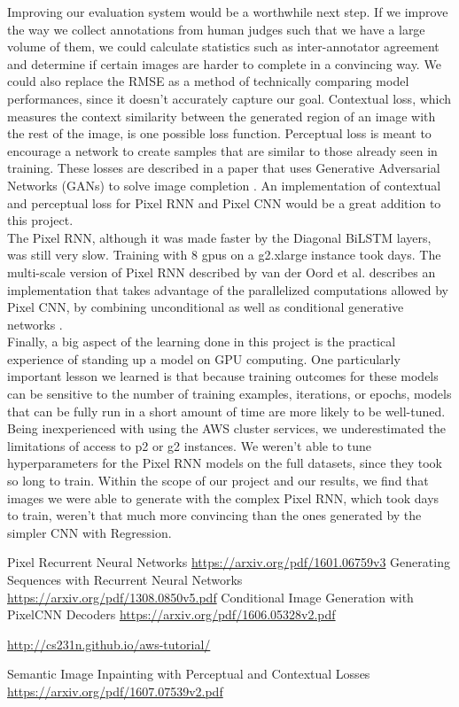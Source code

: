 \documentclass[10pt,twocolumn,letterpaper]{article}
\begin{document}
Improving our evaluation system would be a worthwhile next step. If we improve the way we collect annotations from human judges such that we have a large volume of them, we could calculate statistics such as inter-annotator agreement and determine if certain images are harder to complete in a convincing way. We could also replace the RMSE as a method of technically comparing model performances, since it doesn't accurately capture our goal. Contextual loss, which measures the context similarity between the generated region of an image with the rest of the image, is one possible loss function. Perceptual loss is meant to encourage a network to create samples that are similar to those already seen in training. These losses are described in a paper that uses Generative Adversarial Networks (GANs) to solve image completion \cite{inpaint}. An implementation of contextual and perceptual loss for Pixel RNN and Pixel CNN would be a great addition to this project. \\

The Pixel RNN, although it was made faster by the Diagonal BiLSTM layers, was still very slow. Training with 8 gpus on a g2.xlarge instance took days. The multi-scale version of Pixel RNN described by van der Oord et al. describes an implementation that takes advantage of the parallelized computations allowed by Pixel CNN, by combining unconditional as well as conditional generative networks \cite{pixelRNN}. \\

Finally, a big aspect of the learning done in this project is the practical experience of standing up a model on GPU computing. One particularly important lesson we learned is that because training outcomes for these models can be sensitive to the number of training examples, iterations, or epochs, models that can be fully run in a short amount of time are more likely to be well-tuned. Being inexperienced with using the AWS cluster services, we underestimated the limitations of access to p2 or g2 instances. We weren't able to tune hyperparameters for the Pixel RNN models on the full datasets, since they took so long to train. Within the scope of our project and our results, we find that images we were able to generate with the complex Pixel RNN, which took days to train, weren't that much more convincing than the ones generated by the simpler CNN with Regression.

\begin{thebibliography}{1}
 Pixel Recurrent Neural Networks \url{https://arxiv.org/pdf/1601.06759v3}
 Generating Sequences with Recurrent Neural Networks \url{https://arxiv.org/pdf/1308.0850v5.pdf}
 Conditional Image Generation with PixelCNN Decoders \url{https://arxiv.org/pdf/1606.05328v2.pdf}

 \url{http://cs231n.github.io/aws-tutorial/}

 Semantic Image Inpainting with Perceptual and Contextual Losses \url{https://arxiv.org/pdf/1607.07539v2.pdf}
\end{thebibliography}
\end{document}
